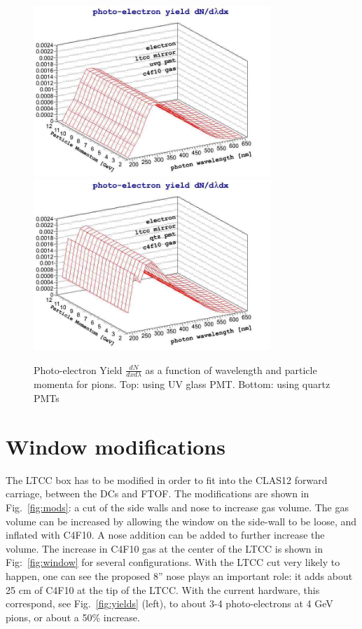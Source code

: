 \documentclass{article}
\begin{document}
\clearpage
\begin{figure}[ht]
	\centering
	\includegraphics[width=0.8\textwidth]{img/photon_yield_spectrum_electron_gasc4f10_mirrorltcc_pmtuvg2.jpg}
	\includegraphics[width=0.8\textwidth]{img/photon_yield_spectrum_electron_gasc4f10_mirrorltcc_pmtqtz2.jpg}
	\caption{\scriptsize Photo-electron Yield $\frac{dN}{dxd\lambda}$  as a function of wavelength and particle momenta 
	for  pions. Top: using UV glass PMT. Bottom: using quartz PMTs}
	\label{fig:quartz}
\end{figure}




\clearpage\newpage
\section{Window modifications}
The LTCC box has to be modified in order to fit into the CLAS12 forward carriage, between the DCs and FTOF.
The modifications are shown in Fig.~\ref{fig:mods}: a cut of the side walls and nose to increase gas volume.
The gas volume can be increased by allowing the window on the side-wall to be loose, and inflated with C4F10. 
A nose addition can be added to further increase the volume. The increase in C4F10 gas at the center of the LTCC
is shown in Fig:~\ref{fig:window} for several configurations. With the LTCC cut very likely to happen, one can see the 
proposed 8'' nose plays an important role: it adds about 25 cm of C4F10 at the tip of the LTCC. 
With the current hardware, this correspond, see Fig.~\ref{fig:yields} (left), to about 3-4 photo-electrons at 4 GeV pions,
or about a 50\% increase.
\end{document}
